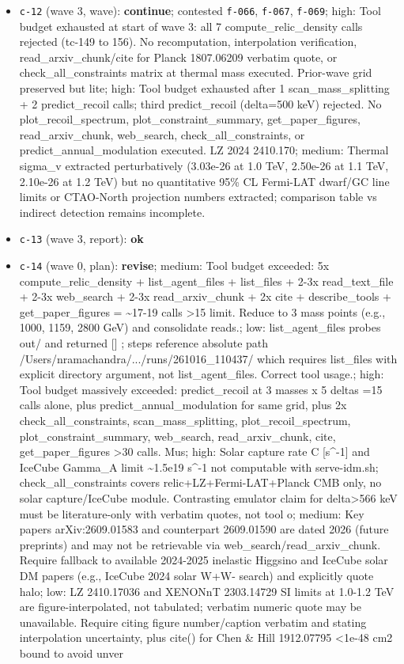 \documentclass[11pt,a4paper]{article}
\begin{document}
\begin{itemize}
  \item \texttt{c-12} (wave 3, wave): \textbf{continue}; contested \texttt{f-066}, \texttt{f-067}, \texttt{f-069}; high: Tool budget exhausted at start of wave 3: all 7 compute\_relic\_density calls rejected (tc-149 to 156). No recomputation, interpolation verification, read\_arxiv\_chunk/cite for Planck 1807.06209 verbatim quote, or check\_all\_constraints matrix at thermal mass executed. Prior-wave grid preserved but lite; high: Tool budget exhausted after 1 scan\_mass\_splitting + 2 predict\_recoil calls; third predict\_recoil (delta=500 keV) rejected. No plot\_recoil\_spectrum, plot\_constraint\_summary, get\_paper\_figures, read\_arxiv\_chunk, web\_search, check\_all\_constraints, or predict\_annual\_modulation executed. LZ 2024 2410.170; medium: Thermal sigma\_v extracted perturbatively (3.03e-26 at 1.0 TeV, 2.50e-26 at 1.1 TeV, 2.10e-26 at 1.2 TeV) but no quantitative 95\% CL Fermi-LAT dwarf/GC line limits or CTAO-North projection numbers extracted; comparison table vs indirect detection remains incomplete.
  \item \texttt{c-13} (wave 3, report): \textbf{ok}
  \item \texttt{c-14} (wave 0, plan): \textbf{revise}; medium: Tool budget exceeded: 5x compute\_relic\_density + list\_agent\_files + list\_files + 2-3x read\_text\_file + 2-3x web\_search + 2-3x read\_arxiv\_chunk + 2x cite + describe\_tools + get\_paper\_figures = \textasciitilde{}17-19 calls \textgreater{}15 limit. Reduce to 3 mass points (e.g., 1000, 1159, 2800 GeV) and consolidate reads.; low: list\_agent\_files probes out/ and returned [] ; steps reference absolute path /Users/nramachandra/.../runs/261016\_110437/ which requires list\_files with explicit directory argument, not list\_agent\_files. Correct tool usage.; high: Tool budget massively exceeded: predict\_recoil at 3 masses x 5 deltas =15 calls alone, plus predict\_annual\_modulation for same grid, plus 2x check\_all\_constraints, scan\_mass\_splitting, plot\_recoil\_spectrum, plot\_constraint\_summary, web\_search, read\_arxiv\_chunk, cite, get\_paper\_figures \textgreater{}30 calls. Mus; high: Solar capture rate C [s\textasciicircum{}-1] and IceCube Gamma\_A limit \textasciitilde{}1.5e19 s\textasciicircum{}-1 not computable with serve-idm.sh; check\_all\_constraints covers relic+LZ+Fermi-LAT+Planck CMB only, no solar capture/IceCube module. Contrasting emulator claim for delta\textgreater{}566 keV must be literature-only with verbatim quotes, not tool o; medium: Key papers arXiv:2609.01583 and counterpart 2609.01590 are dated 2026 (future preprints) and may not be retrievable via web\_search/read\_arxiv\_chunk. Require fallback to available 2024-2025 inelastic Higgsino and IceCube solar DM papers (e.g., IceCube 2024 solar W+W- search) and explicitly quote halo; low: LZ 2410.17036 and XENONnT 2303.14729 SI limits at 1.0-1.2 TeV are figure-interpolated, not tabulated; verbatim numeric quote may be unavailable. Require citing figure number/caption verbatim and stating interpolation uncertainty, plus cite() for Chen \& Hill 1912.07795 \textless{}1e-48 cm2 bound to avoid unver

\end{itemize}
\end{document}
